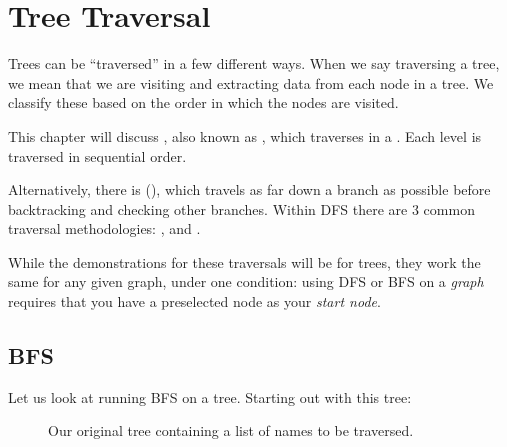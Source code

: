 \chapter{Tree Traversal}



Trees can be ``traversed'' in a few different ways. When we say traversing a tree, we mean that we are visiting and extracting data from each node in a tree. We classify these  based on the order in which the nodes are visited.

This chapter will discuss , also known as , which traverses in a . Each level is traversed in sequential order.

Alternatively, there is  (), which travels as far down a branch as possible before backtracking and checking other branches. Within DFS there are 3 common traversal methodologies: ,  and .

While the demonstrations for these traversals will be for trees, they work the same for any given graph, under one condition: using DFS or BFS on a \emph{graph} requires that you have a preselected node as your \emph{start node}.
\section{BFS}
Let us look at running BFS on a tree. Starting out with this tree:
\begin{figure}[H]
    \centering

    \caption{Our original tree containing a list of names to be traversed.}
    \label{fig:originalTree}
\end{figure}

